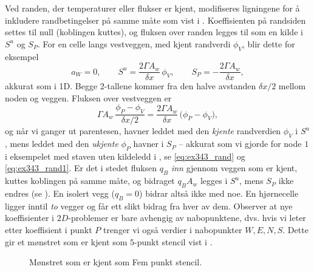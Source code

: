 Ved randen, der temperaturer eller flukser er kjent, modifiseres ligningene for å inkludere randbetingelser på samme måte som vist i . Koeffisienten på randsiden settes til null (koblingen kuttes), og fluksen over randen legges til som en kilde i $S^u$ og $S_P$. For en celle langs vestveggen, med kjent randverdi $\phi_V$, blir dette for eksempel
\[
a_W = 0, \qquad S^u = \frac{2\Gamma A_w}{\delta x}\,\phi_V, \qquad S_P = -\frac{2\Gamma A_w}{\delta x},
\]
akkurat som i 1D. Begge 2-tallene kommer fra den halve avstanden $\delta x/2$ mellom noden og veggen. Fluksen over vestveggen er
\[
\Gamma A_w\,\frac{\phi_P-\phi_V}{\delta x/2} = \frac{2\Gamma A_w}{\delta x}\,\big(\phi_P-\phi_V\big),
\]
og når vi ganger ut parentesen, havner leddet med den \emph{kjente} randverdien $\phi_V$ i $S^u$, mens leddet med den \emph{ukjente} $\phi_P$ havner i $S_P$ -- akkurat som vi gjorde for node $1$ i eksempelet med staven uten kildeledd i , se \eqref{eq:ex343_rand} og \eqref{eq:ex343_rand1}. Er det i stedet fluksen $q_B$ \emph{inn} gjennom veggen som er kjent, kuttes koblingen på samme måte, og bidraget $q_B A_w$ legges i $S^u$, mens $S_P$ ikke endres (se ). En isolert vegg ($q_B=0$) bidrar altså ikke med noe. En hjørnecelle ligger inntil \emph{to} vegger og får ett slikt bidrag fra hver av dem. Observer at nye koeffisienter i $2D$-problemer er bare avhengig av nabopunktene, dvs. hvis vi leter etter koeffisient i punkt $P$ trenger vi også verdier i nabopunkter $W,E,N,S$. Dette gir et mønstret som er kjent som $5$-punkt stencil vist i .
\begin{figure}[ht!]\centering 
{}\caption{Mønstret som er kjent som Fem punkt stencil.}\label{5pt_stencil}
\end{figure}

